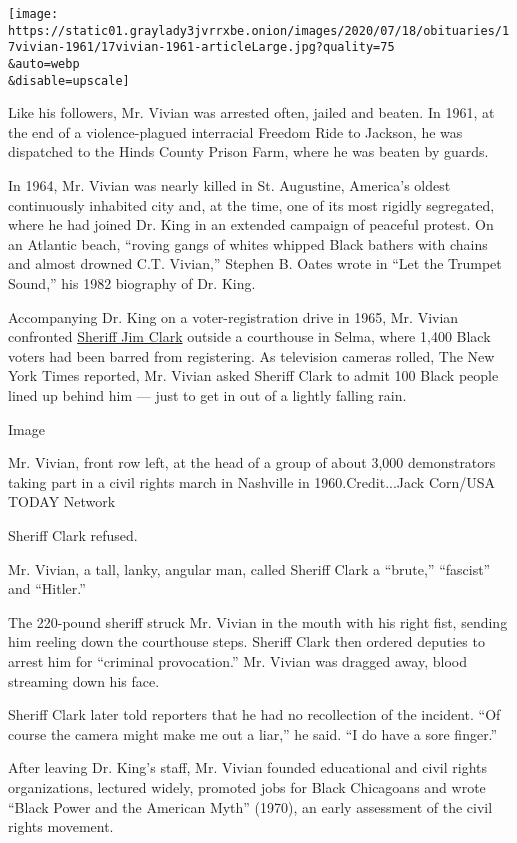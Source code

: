 \texttt{[image: https://static01.graylady3jvrrxbe.onion/images/2020/07/18/obituaries/17vivian-1961/17vivian-1961-articleLarge.jpg?quality=75\\\&auto=webp\\\&disable=upscale]}

Like his followers, Mr. Vivian was arrested often, jailed and beaten. In
1961, at the end of a violence-plagued interracial Freedom Ride to
Jackson, he was dispatched to the Hinds County Prison Farm, where he was
beaten by guards.

In 1964, Mr. Vivian was nearly killed in St. Augustine, America's oldest
continuously inhabited city and, at the time, one of its most rigidly
segregated, where he had joined Dr. King in an extended campaign of
peaceful protest. On an Atlantic beach, ``roving gangs of whites whipped
Black bathers with chains and almost drowned C.T. Vivian,'' Stephen B.
Oates wrote in ``Let the Trumpet Sound,'' his 1982 biography of Dr.
King.

Accompanying Dr. King on a voter-registration drive in 1965, Mr. Vivian
confronted
\href{https://www.nytimes3xbfgragh.onion/2007/06/07/us/07clark.html}{Sheriff
Jim Clark} outside a courthouse in Selma, where 1,400 Black voters had
been barred from registering. As television cameras rolled, The New York
Times reported, Mr. Vivian asked Sheriff Clark to admit 100 Black people
lined up behind him --- just to get in out of a lightly falling rain.

Image

Mr. Vivian, front row left, at the head of a group of about 3,000
demonstrators taking part in a civil rights march in Nashville in
1960.Credit...Jack Corn/USA TODAY Network

Sheriff Clark refused.

Mr. Vivian, a tall, lanky, angular man, called Sheriff Clark a
``brute,'' ``fascist'' and ``Hitler.''

The 220-pound sheriff struck Mr. Vivian in the mouth with his right
fist, sending him reeling down the courthouse steps. Sheriff Clark then
ordered deputies to arrest him for ``criminal provocation.'' Mr. Vivian
was dragged away, blood streaming down his face.

Sheriff Clark later told reporters that he had no recollection of the
incident. ``Of course the camera might make me out a liar,'' he said.
``I do have a sore finger.''

After leaving Dr. King's staff, Mr. Vivian founded educational and civil
rights organizations, lectured widely, promoted jobs for Black
Chicagoans and wrote ``Black Power and the American Myth'' (1970), an
early assessment of the civil rights movement.

